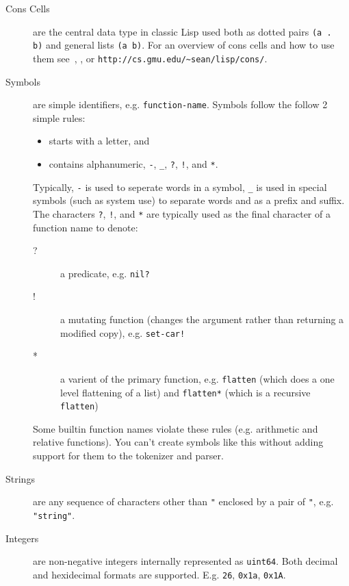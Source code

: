 \documentclass[12pt]{article}
\begin{document}
\begin{description}

\item[Cons Cells] are the central data type in classic Lisp used both
  as dotted pairs \verb|(a .  b)| and general lists \verb|(a b)|. For
  an overview of cons cells and how to use them
  see~\cite{Abelson85Structure}, \cite{Steele:1984:CLL}, or
  \verb|http://cs.gmu.edu/~sean/lisp/cons/|.

\item[Symbols] are simple identifiers, e.g. \verb|function-name|.
Symbols follow the follow 2 simple rules:

\begin{itemize}
\item starts with a letter, and
\item contains alphanumeric, \verb|-|, \verb|_|, \verb|?|, \verb|!|, and \verb|*|.
\end{itemize}

Typically, \verb|-| is used to seperate words in a symbol, \verb|_| is
used in special symbols (such as system use) to separate words and as
a prefix and suffix. The characters \verb|?|, \verb|!|, and \verb|*|
are typically used as the final character of a function name to
denote:

\begin{description}
\item [?] a predicate, e.g. \verb|nil?|
\item [!] a mutating function (changes the argument rather than
  returning a modified copy), e.g. \verb|set-car!|
\item [*] a varient of the primary function, e.g. \verb|flatten|
  (which does a one level flattening of a list) and \verb|flatten*|
  (which is a recursive \verb|flatten|)
\end{description}

Some builtin function names violate these rules (e.g. arithmetic and
relative functions). You can't create symbols like this without
adding support for them to the tokenizer and parser.

\item[Strings] are any sequence of characters other than \verb|"|
enclosed by a pair of \verb|"|, e.g. \verb|"string"|.

\item[Integers] are non-negative integers internally represented as \verb|uint64|. Both decimal and hexidecimal formats are supported. E.g.
  \verb|26|, \verb|0x1a|, \verb|0x1A|.


\end{description}
\end{document}
